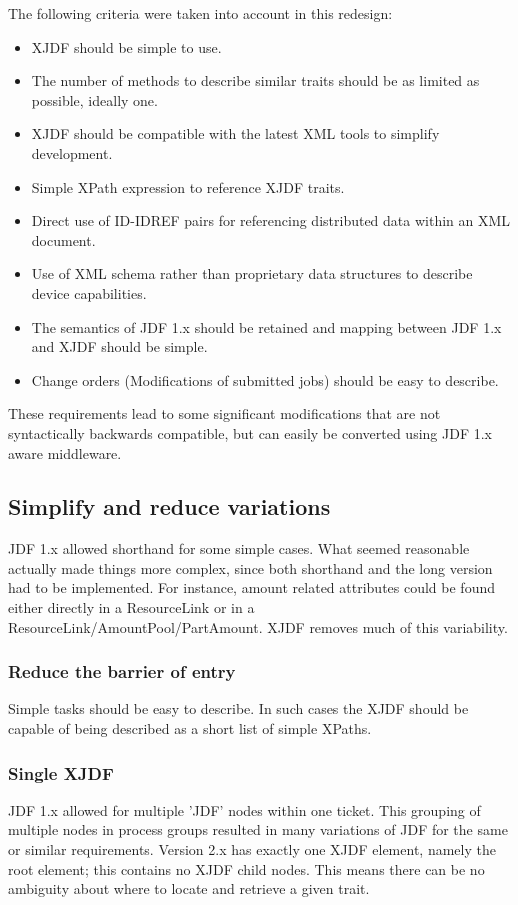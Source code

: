 The following criteria were taken into account in this redesign:

\begin{itemize}
    \item XJDF should be simple to use.
    \item The number of methods to describe similar traits should be as limited as possible, ideally one.
    \item XJDF should be compatible with the latest XML tools to simplify development.
    \item Simple XPath expression to reference XJDF traits.
    \item Direct use of ID-IDREF pairs for referencing distributed data within an XML document.
    \item Use of XML schema rather than proprietary data structures to describe device capabilities.
    \item The semantics of JDF 1.x should be retained and mapping between JDF 1.x and XJDF should be simple.
    \item Change orders (Modifications of submitted jobs) should be easy to describe.
\end{itemize}

These requirements lead to some significant modifications that are not syntactically backwards compatible, but can easily be converted using JDF 1.x aware middleware.


\subsection{Simplify and reduce variations}
JDF 1.x allowed shorthand for some simple cases. What seemed reasonable actually made things more complex, since both shorthand and the long version had to be implemented. For instance, amount related attributes could be found either directly in a ResourceLink or in a ResourceLink/AmountPool/PartAmount. XJDF removes much of this variability.

\subsubsection{Reduce the barrier of entry}
Simple tasks should be easy to describe. In such cases the XJDF should be capable of being described as a short list of simple XPaths.

\subsubsection{Single XJDF}
JDF 1.x allowed for multiple 'JDF' nodes within one ticket. This grouping of multiple nodes in process groups resulted in many variations of JDF for the same or similar requirements. Version 2.x has exactly one XJDF element, namely the root element; this contains no XJDF child nodes. This means there can be no ambiguity about where to locate and retrieve a given trait.

